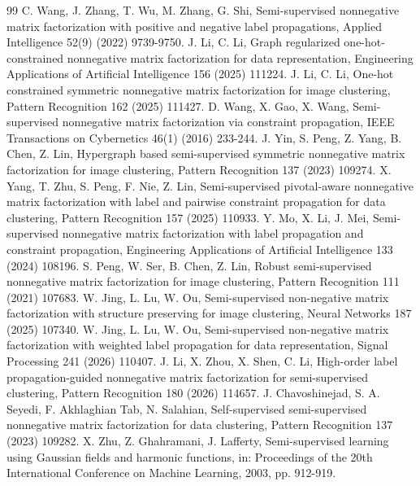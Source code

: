 \documentclass[a4paper,preprint,12pt]{elsarticle}
\theoremstyle{remark}
\begin{document}
\begin{thebibliography}{99}
 C. Wang, J. Zhang, T. Wu, M. Zhang, G. Shi, Semi-supervised nonnegative matrix factorization with positive and negative label propagations, Applied Intelligence 52(9) (2022) 9739-9750.
 J. Li, C. Li, Graph regularized one-hot-constrained nonnegative matrix factorization for data representation, Engineering Applications of Artificial Intelligence 156 (2025) 111224.
 J. Li, C. Li, One-hot constrained symmetric nonnegative matrix factorization for image clustering, Pattern Recognition 162 (2025) 111427.
 D. Wang, X. Gao, X. Wang, Semi-supervised nonnegative matrix factorization via constraint propagation, IEEE Transactions on Cybernetics 46(1) (2016) 233-244.
 J. Yin, S. Peng, Z. Yang, B. Chen, Z. Lin, Hypergraph based semi-supervised symmetric nonnegative matrix factorization for image clustering, Pattern Recognition 137 (2023) 109274.
 X. Yang, T. Zhu, S. Peng, F. Nie, Z. Lin, Semi-supervised pivotal-aware nonnegative matrix factorization with label and pairwise constraint propagation for data clustering, Pattern Recognition 157 (2025) 110933.
 Y. Mo, X. Li, J. Mei, Semi-supervised nonnegative matrix factorization with label propagation and constraint propagation, Engineering Applications of Artificial Intelligence 133 (2024) 108196.
 S. Peng, W. Ser, B. Chen, Z. Lin, Robust semi-supervised nonnegative matrix factorization for image clustering, Pattern Recognition 111 (2021) 107683.
 W. Jing, L. Lu, W. Ou, Semi-supervised non-negative matrix factorization with structure preserving for image clustering, Neural Networks 187 (2025) 107340.
 W. Jing, L. Lu, W. Ou, Semi-supervised non-negative matrix factorization with weighted label propagation for data representation, Signal Processing 241 (2026) 110407.
 J. Li, X. Zhou, X. Shen, C. Li, High-order label propagation-guided nonnegative matrix factorization for semi-supervised clustering, Pattern Recognition 180 (2026) 114657.
 J. Chavoshinejad, S. A. Seyedi, F. Akhlaghian Tab, N. Salahian, Self-supervised semi-supervised nonnegative matrix factorization for data clustering, Pattern Recognition 137 (2023) 109282.
 X. Zhu, Z. Ghahramani, J. Lafferty, Semi-supervised learning using Gaussian fields and harmonic functions, in: Proceedings of the 20th International Conference on Machine Learning, 2003, pp. 912-919.

\end{thebibliography}
\end{document}
